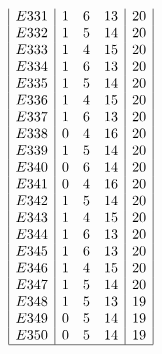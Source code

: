 \documentclass[12pt]{article}
\begin{document}
\begin{multicols}{3}
\begin{equation*}
\begin{array}{|c|ccc|c|}
E331&1&6&13&20\\
E332&1&5&14&20\\
E333&1&4&15&20\\
E334&1&6&13&20\\
E335&1&5&14&20\\
E336&1&4&15&20\\
E337&1&6&13&20\\
E338&0&4&16&20\\
E339&1&5&14&20\\
E340&0&6&14&20\\
E341&0&4&16&20\\
E342&1&5&14&20\\
E343&1&4&15&20\\
E344&1&6&13&20\\
E345&1&6&13&20\\
E346&1&4&15&20\\
E347&1&5&14&20\\
E348&1&5&13&19\\
E349&0&5&14&19\\
E350&0&5&14&19\\
\hline
\end{array}
\end{equation*}


\end{multicols}
\end{document}
